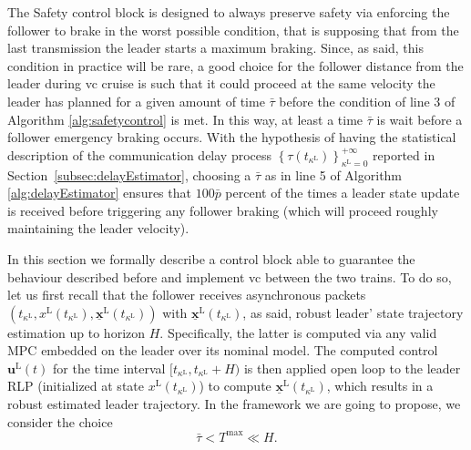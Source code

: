 \documentclass[letterpaper, 10 pt, conference]{ieeeconf}
\theoremstyle{definition}
\theoremstyle{nopoint}
\newcommand{\tildeAdd}{~}
\begin{document}
The Safety control block is designed to always preserve safety via enforcing the follower to brake in the worst possible condition, that is supposing that from the last transmission the leader starts a maximum braking. Since, as said, this condition in practice will be rare, a good choice for the follower distance from the leader during \gls{vc} cruise is such that it could proceed at the same velocity the leader has planned for a given amount of time $\bar{\tau}$ before the condition of line  $3$ of  Algorithm \ref{alg:safetycontrol} is met. In this way, at least a time $\bar{\tau}$ is wait before a follower emergency braking occurs. 
With the hypothesis of having the statistical description of the communication delay process $ \left\{ \tau(t_{\kappa^\mathrm{L}})\right\}_{\kappa^\mathrm{L}=0}^{+\infty}$ reported in Section\tildeAdd\ref{subsec:delayEstimator}, 
choosing a $\bar{\tau}$ as in line 5 of Algorithm \ref{alg:delayEstimator} ensures that $100 \bar{p}$ percent of the times a leader state update is received before triggering any follower braking (which will proceed roughly maintaining the leader velocity).
 
In this section we formally describe a control block able to guarantee the behaviour described before and implement \gls{vc} between the two trains.  
To do so, let us first recall that the follower receives asynchronous packets $\left ( t_{\kappa^\mathrm{L}}, x^\mathrm{L}(t_{\kappa^\mathrm{L}}),\underline{\mathbf{x}}^\mathrm{L}(t_{\kappa^\mathrm{L}})\right)$ with $\underline{\mathbf{x}}^\mathrm{L}(t_{\kappa^\mathrm{L}})$, as said, robust leader' state trajectory estimation up to horizon $H$. Specifically, the latter is computed via any valid MPC embedded on the leader over its nominal model. The computed control $\mathbf{u}^\mathrm{L}(t)$ for the time interval  $[t_{\kappa^\mathrm{L}},t_{\kappa^\mathrm{L}}+H)$ is then applied open loop to the leader RLP (initialized at state $x^\mathrm{L}(t_{\kappa^\mathrm{L}})$) to compute $\underline{\mathbf{x}}^\mathrm{L}(t_{\kappa^\mathrm{L}})$, which results in a robust estimated leader trajectory. 
In the framework we are going to propose, we consider the choice
\begin{equation}\label{eq:tau_H_inequality}
\bar{\tau} < T^{\max}\ll H.
\end{equation}
\end{document}

